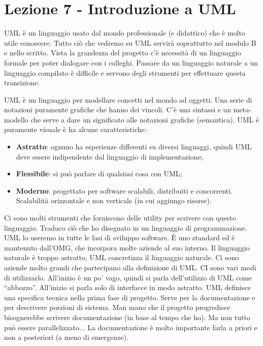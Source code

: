



\section{Lezione 7 - Introduzione a UML}

UML è un linguaggio usato dal mondo professionale (e didattico) che è molto utile conoscere. Tutto ciò che vedremo su UML servirà soprattutto nel modulo B e nello scritto. Vista la grandezza del progetto c'è necessità di un linguaggio formale per poter dialogare con i colleghi. Passare da un linguaggio naturale a un linguaggio compilato è difficile e servono degli strumenti per effettuare questa transizione. 

UML è un linguaggio per modellare concetti nel mondo ad oggetti. Una serie di notazioni puramente grafiche che hanno dei vincoli. C'è una sintassi e un meta-modello che serve a dare un significato alle notazioni grafiche (semantica). UML è puramente visuale è ha alcune caratteristiche:

\begin{itemize}
\item \textbf{Astratto}: ognuno ha esperienze differenti su diversi linguaggi, quindi UML deve essere indipendente dal linguaggio di implementazione;
\item \textbf{Flessibile}: si può parlare di qualsiasi cosa con UML;
\item \textbf{Moderno}: progettato per software scalabili, distribuiti e concorrenti. Scalabilità orizzontale e non verticale (in cui aggiungo risorse).
\end{itemize}

Ci sono molti strumenti che forniscono delle utility per scrivere con questo linguaggio. Traduco ciò che ho disegnato in un linguaggio di programmazione. UML lo useremo in tutte le fasi di sviluppo software. È uno standard ed è mantenuto dall'OMG, che incorpora molte aziende al suo interno. Il linguaggio naturale è troppo astratto, UML concretizza il linguaggio naturale. Ci sono aziende molto grandi che partecipano alla definizione di UML. CI sono vari modi di utilizzarlo. All'inizio è un po' vago, quindi si parla dell'utilizzo di UML come ``abbozzo''. All'inizio si parla solo di interfacce in modo astratto. UML definisce una specifica tecnica nella prima fase di progetto. Serve per la documentazione e per descrivere porzioni di sistema. Man mano che il progetto progredisce bisognerebbe scrivere documentazione (in base al tempo che ho). Ma non tutto può essere parallelizzato... La documentazione è molto importante farla a priori e non a posteriori (a meno di emergenze).

